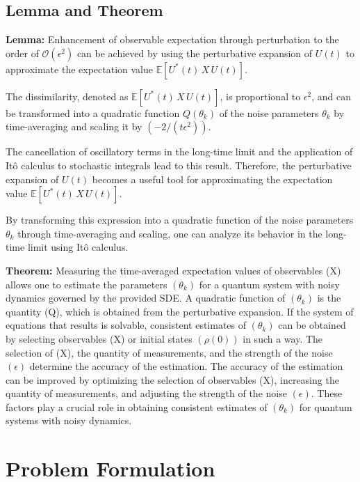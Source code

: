 \documentclass[journal,twocolumn]{IEEEtran}
\begin{document}
\subsection{Lemma and Theorem}
\textbf{Lemma:} Enhancement of observable expectation through perturbation to the order of \( \mathcal{O}(\epsilon^2) \) can be achieved by using the perturbative expansion of \( U(t) \) to approximate the expectation value \( \mathbb{E}[U^{*}(t)\, X\, U(t)] \). 

The dissimilarity, denoted as \( \mathbb{E}[U^{*}(t)\, X\, U(t)] \), is proportional to \( \epsilon^2 \), and can be transformed into a quadratic function \( Q(\theta_k) \) of the noise parameters \( \theta_k \) by time-averaging and scaling it by $(-2/(t \epsilon^2))$.

The cancellation of oscillatory terms in the long-time limit and the application of Itô calculus to stochastic integrals lead to this result. Therefore, the perturbative expansion of \( U(t) \) becomes a useful tool for approximating the expectation value \( \mathbb{E}[U^{*}(t)\, X\, U(t)] \). 

By transforming this expression into a quadratic function of the noise parameters \( \theta_k \) through time-averaging and scaling, one can analyze its behavior in the long-time limit using Itô calculus.

\textbf{Theorem:}
 Measuring the time-averaged expectation values of observables (X) allows one to estimate the parameters $(\theta_k)$ for a quantum system with noisy dynamics governed by the provided SDE. A quadratic function of $(\theta_k)$ is the quantity (Q), which is obtained from the perturbative expansion. If the system of equations that results is solvable, consistent estimates of $(\theta_k)$ can be obtained by selecting observables (X) or initial states $(\rho(0))$ in such a way. The selection of (X), the quantity of measurements, and the strength of the noise $(\epsilon)$ determine the accuracy of the estimation. The accuracy of the estimation can be improved by optimizing the selection of observables (X), increasing the quantity of measurements, and adjusting the strength of the noise $(\epsilon)$. These factors play a crucial role in obtaining consistent estimates of $(\theta_k)$ for quantum systems with noisy dynamics. 

\section{Problem Formulation}
\end{document}

